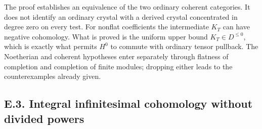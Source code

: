\begin{remark}\label{rem:DE-E2-coherent-derived-heart}
The proof establishes an equivalence of the two ordinary coherent categories.  It does not identify an ordinary crystal with a derived crystal concentrated in degree zero on every test.  For nonflat coefficients the intermediate $K_T$ can have negative cohomology.  What is proved is the uniform upper bound $K_T\in D^{\leq0}$, which is exactly what permits $H^0$ to commute with ordinary tensor pullback.  The Noetherian and coherent hypotheses enter separately through flatness of completion and completion of finite modules; dropping either leads to the counterexamples already given.
\end{remark}

\subsection{E.3. Integral infinitesimal cohomology without divided powers}

